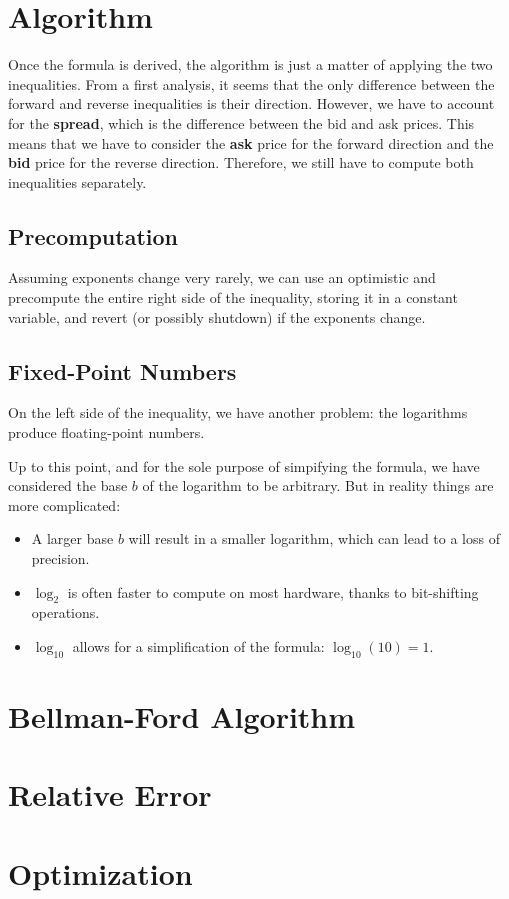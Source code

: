 \documentclass[11pt]{article}
\begin{document}
\section{Algorithm}
Once the formula is derived, the algorithm is just a matter of applying the two inequalities. From a first analysis, it seems that the only difference between the forward and reverse inequalities is their direction. However, we have to account for the \textbf{spread}, which is the difference between the bid and ask prices. This means that we have to consider the \textbf{ask} price for the forward direction and the \textbf{bid} price for the reverse direction. Therefore, we still have to compute both inequalities separately.

\subsection{Precomputation}
Assuming exponents change very rarely, we can use an optimistic and precompute the entire right side of the inequality, storing it in a constant variable, and revert (or possibly shutdown) if the exponents change.

\subsection{Fixed-Point Numbers}
On the left side of the inequality, we have another problem: the logarithms produce floating-point numbers.


Up to this point, and for the sole purpose of simpifying the formula, we have considered the base \(b\) of the logarithm to be arbitrary.
But in reality things are more complicated:
\begin{itemize}
    \item A larger base $b$ will result in a smaller logarithm, which can lead to a loss of precision.
    \item $\log_{2}$ is often faster to compute on most hardware, thanks to bit-shifting operations.
    \item $\log_{10}$ allows for a simplification of the formula: $\log_{10}(10) = 1$.
\end{itemize}

\section{Bellman-Ford Algorithm}

\section{Relative Error}

\section{Optimization}
\end{document}

